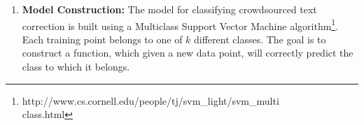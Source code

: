 \documentclass{acm_proc_article-sp}
\begin{document}
\begin{enumerate}
\begin{itemize}
It must be noted that by design tokens are always assigned to one class based on priority, although in principle it may be possible to assign them to multiple classes\footnote{For e.g. a correction of ``t$\$$e" to ``the" could be either a Spellcheck or a Punctuation Error correction but we assign it to Spellcheck }.
\end{itemize}



\item \textbf{Model Construction: } The model for classifying crowdsourced text correction is built using a Multiclass Support Vector Machine algorithm\footnote{http://www.cs.cornell.edu/people/tj/svm\_light/svm\_multi\\class.html}. Each training point belongs to one of $k$ different classes. The goal is to construct a function, which given a new data point, will correctly predict the class to which it belongs.


\end{enumerate}
\end{document}
